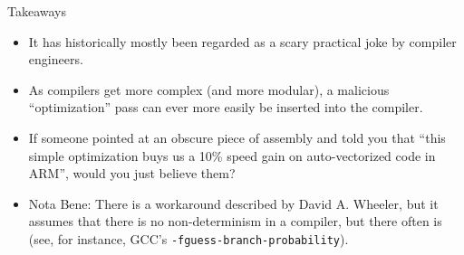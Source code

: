 \documentclass[aspectratio=169]{beamer}
\begin{document}
  \begin{frame}{Takeaways}
    \begin{itemize}
      \item It has historically mostly been regarded as a scary practical joke
            by compiler engineers.
      \item As compilers get more complex (and more modular), a malicious
            “optimization” pass can ever more easily be inserted into the
            compiler.
      \item If someone pointed at an obscure piece of assembly and told you
            that “this simple optimization buys us a 10\% speed gain on
            auto-vectorized code in ARM”, would you just believe them?
      \item Nota Bene: There is a workaround described by David A. Wheeler, but
            it assumes that there is no non-determinism in a compiler, but there
            often is (see, for instance, GCC’s \texttt{-fguess-branch-probability}).
    \end{itemize}
  \end{frame}
\end{document}

